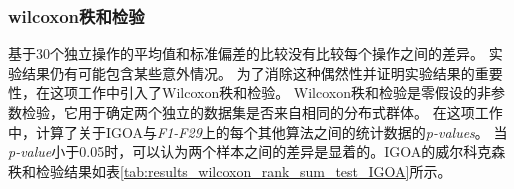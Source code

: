 \subsubsection{wilcoxon秩和检验}

基于30个独立操作的平均值和标准偏差的比较没有比较每个操作之间的差异。 实验结果仍有可能包含某些意外情况。 为了消除这种偶然性并证明实验结果的重要性，在这项工作中引入了Wilcoxon秩和检验。 Wilcoxon秩和检验是零假设的非参数检验，它用于确定两个独立的数据集是否来自相同的分布式群体。 在这项工作中，计算了关于IGOA与\emph{F1-F29}上的每个其他算法之间的统计数据的\emph{p-values}。 当\emph{p-value}小于0.05时，可以认为两个样本之间的差异是显着的。IGOA的威尔科克森秩和检验结果如表\ref{tab:results_wilcoxon_rank_sum_test_IGOA}所示。


